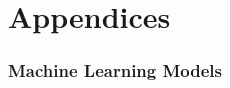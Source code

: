 \documentclass[NOTE, atlasdraft=true, texlive=2016, UKenglish]{\ATLASLATEXPATH atlasdoc}
\begin{document}
\printbibliography
%
%

\clearpage
{}


\clearpage
\appendix
\part*{Appendices}

\section{Machine Learning Models}
\label{apx:MVA}

\end{document}
